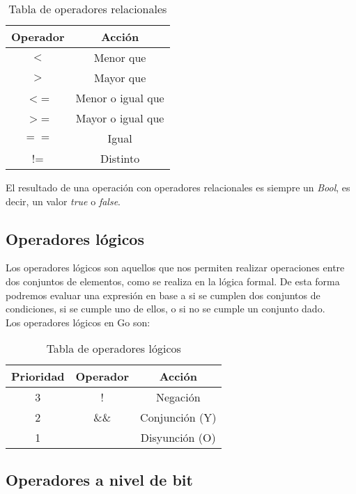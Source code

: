 	\begin{table}[!htb]
		\begin{center}
			\begin{tabular}{cc}
				\textbf{Operador} & \textbf{Acción}\\
				\hline
				$<$ & Menor que\\
				$>$ & Mayor que\\
				$<$= & Menor o igual que\\
				$>$= & Mayor o igual que\\
				$=$$=$ & Igual\\
				!= & Distinto\\
				\hline
			\end{tabular}
		\end{center}
		\caption{Tabla de operadores relacionales}
		\label{oprelacionales}
	\end{table}

	El resultado de una operación con operadores relacionales es siempre un
	\emph{Bool}, es decir, un valor \emph{true} o \emph{false}.

	\subsection{Operadores lógicos}

	Los operadores lógicos son aquellos que nos permiten realizar operaciones
	entre dos conjuntos de elementos, como se realiza en la lógica formal. De
	esta forma podremos evaluar una expresión en base a si se cumplen dos
	conjuntos de condiciones, si se cumple uno de ellos, o si no se cumple un
	conjunto dado.\\

	Los operadores lógicos en Go son:

	\begin{table}[htb]
		\begin{center}
			\begin{tabular}{ccc}
				\textbf{Prioridad} & \textbf{Operador} & \textbf{Acción}\\
				\hline
				3 & ! & Negación\\
				2 & \&\& & Conjunción (Y)\\
				1 & \textbar\textbar & Disyunción (O)\\
				\hline
			\end{tabular}
		\end{center}
		\caption{Tabla de operadores lógicos}
	\end{table}

	\subsection{Operadores a nivel de bit}

